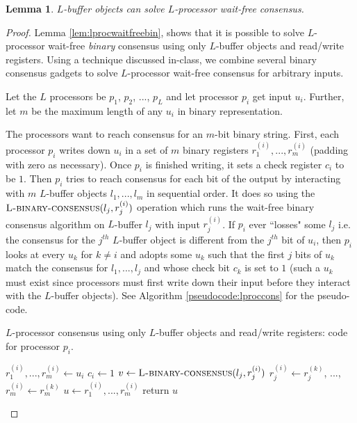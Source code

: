 \documentclass[11pt]{article}
\newtheorem{lemma}[theorem]{Lemma}
\begin{document}
\begin{lemma}
\label{lem:lprocwaitfree}
$L$-buffer objects can solve $L$-processor wait-free consensus.
\end{lemma}
\begin{proof}
Lemma \ref{lem:lprocwaitfreebin}, shows that it is possible to solve $L$-processor wait-free \emph{binary} consensus using only $L$-buffer objects and read/write registers. Using a technique discussed in-class, we combine several binary consensus gadgets to solve $L$-processor wait-free consensus for arbitrary inputs.

Let the $L$ processors be $p_1$, $p_2$, ..., $p_{L}$ and let processor $p_i$ get input $u_i$. Further, let $m$ be the maximum length of any $u_i$ in binary representation. 

The processors want to reach consensus for an $m$-bit binary string. First, each processor $p_i$ writes down $u_i$ in a set of $m$ binary registers $r^{(i)}_1, ..., r^{(i)}_m$ (padding with zero as necessary). Once $p_i$ is finished writing, it sets a check register $c_i$ to be $1$. Then $p_i$ tries to reach consensus for each bit of the output by interacting with $m$ $L$-buffer objects $l_1, ..., l_m$ in sequential order. It does so using the $\textsc{L-binary-consensus}(l_j, r^{(i)}_j)$ operation which runs the wait-free binary consensus algorithm on $L$-buffer $l_j$ with input $r^{(i)}_j$. If $p_i$ ever ``losses" some $l_j$ i.e. the consensus for the $j^{th}$ $L$-buffer object is different from the $j^{th}$ bit of $u_i$, then $p_i$ looks at every $u_k$ for $k \neq i$ and adopts some $u_k$ such that the first $j$ bits of $u_k$ match the consensus for $l_1, ..., l_j$ and whose check bit $c_k$ is set to $1$ (such a $u_k$ must exist since processors must first write down their input before they interact with the $L$-buffer objects). See Algorithm \ref{pseudocode:lproccons} for the pseudo-code.

\begin{algorithm}
	\caption{$L$-processor consensus using only $L$-buffer objects and read/write registers: code for processor $p_i$.}
    \label{pseudocode:lproccons}
    \begin{algorithmic}[1]
	\State $r^{(i)}_1, ..., r^{(i)}_m \leftarrow u_i$
	\State $c_i \leftarrow 1$
		\State $v \leftarrow \textsc{L-binary-consensus}(l_j, r^{(i)}_j)$
					\State $r^{(i)}_j \leftarrow r^{(k)}_j$, ..., $r^{(i)}_m \leftarrow r^{(k)}_m$
				\EndIf
			\EndFor
		\EndIf
	\EndFor 
	\State $u \leftarrow r^{(i)}_1, ..., r^{(i)}_m$
	\State return $u$
    \end{algorithmic}
\end{algorithm}


\end{proof}
\end{document}
